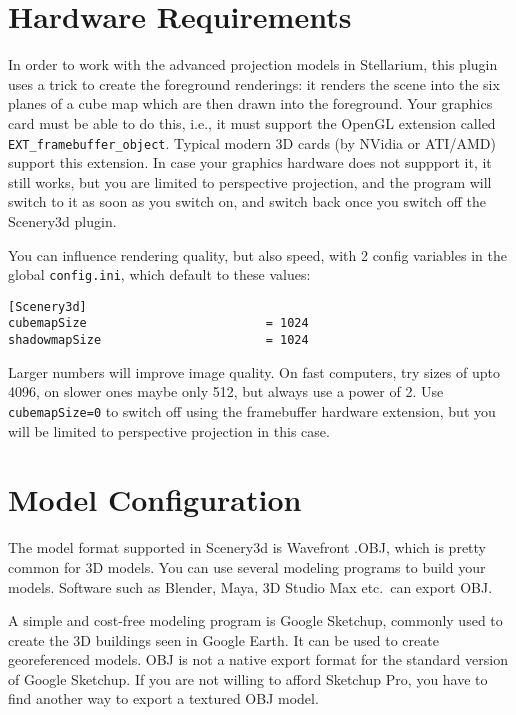 \documentclass[a4paper]{article}
\newcommand{\filename}[1]{\texttt{#1}}
\begin{document}
\section{Hardware Requirements}
\label{sec:HardwareRequirements}


In order to work with the advanced projection models in Stellarium,
this plugin uses a trick to create the foreground renderings: it
renders the scene into the six planes of a cube map which are then
drawn into the foreground. Your graphics card must be able to do this,
i.e., it must support the OpenGL extension called
\texttt{EXT\_framebuffer\_object}. Typical modern 3D cards (by NVidia
or ATI/AMD) support this extension. In case your graphics hardware
does not suppport it, it still works, but you are limited to
perspective projection, and the program will switch to it as soon as
you switch on, and switch back once you switch off the Scenery3d
plugin.

You can influence rendering quality, but also speed, with 2 config
variables in the global \filename{config.ini}, which default to these values:
\begin{verbatim}
[Scenery3d]
cubemapSize                         = 1024
shadowmapSize                       = 1024
\end{verbatim}

Larger numbers will improve image quality. On fast computers, try
sizes of upto 4096, on slower ones maybe only 512, but always use a
power of 2.  Use \verb|cubemapSize=0| to switch off using the framebuffer
hardware extension, but you will be limited to perspective projection
in this case.


\section{Model Configuration}
\label{sec:ModelConfiguration}


The model format supported in Scenery3d is Wavefront .OBJ, which is
pretty common for 3D models.  You can use several modeling programs to
build your models. Software such as Blender, Maya, 3D Studio
Max etc.\ can export OBJ. 

A simple and cost-free modeling program is Google Sketchup, commonly
used to create the 3D buildings seen in Google Earth. It can be used
to create georeferenced models.  OBJ is not a native export format for
the standard version of Google Sketchup. If you are not willing to
afford Sketchup Pro, you have to find another way to export a textured
OBJ model.
\end{document}
